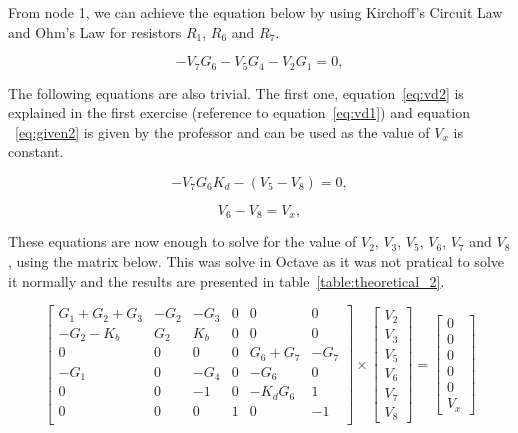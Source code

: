 From node 1, we can achieve the equation below by using Kirchoff's Circuit Law and Ohm's Law for resistors $R_1$, $R_6$ and $R_7$.

\begin{equation}
  -V_{7}G_{6} - V_{5}G_{4} - V_{2}G_{1} = 0,
  \label{eq:node21}
\end{equation}


The following equations are also trivial. The first one, equation~\ref{eq:vd2} is explained in the first exercise (reference to equation~\ref{eq:vd1}) and equation ~\ref{eq:given2} is given by the professor and can be used as the value of $V_x$ is constant.

\begin{equation}
  -V_{7}G_{6}K_{d} - (V_{5} - V_{8}) = 0,
  \label{eq:vd2}
\end{equation}


\begin{equation}
  V_{6} - V_{8} = V_{x},
  \label{eq:given2}
\end{equation}

These equations are now enough to solve for the value of $V_2$, $V_3$, $V_5$, $V_6$, $V_7$ and $V_8$, using the matrix below. This was solve in Octave as it was not pratical to solve it normally and the results are presented in table~\ref{table:theoretical_2}.

\begin{equation}
\left[ \begin{array}{cccccc} 
		G_1+G_2+G_3 & -G_2 & -G_3 & 0 & 0 & 0 \\
		-G_2-K_b & G_2 & K_b & 0 & 0 & 0 \\ 
		0 & 0 & 0 & 0 & G_6+G_7 & -G_7  \\ 
		-G_1 & 0 & -G_4 & 0 & -G_6 & 0  \\ 
		0 & 0 & -1 & 0 & -K_dG_6 & 1 \\ 
		0 & 0 & 0 & 1 & 0 & -1 \\ 
\end{array} \right]
\times \left[ \begin{array}{c} V_2 \\ V_3 \\  V_5 \\ V_6 \\ V_7 \\ V_8 \end{array} \right] =
\left[ \begin{array}{c} 0 \\ 0 \\ 0 \\ 0 \\ 0 \\ V_x  \end{array} \right]
\label{eq:nodalmatrix2}
\end{equation}

